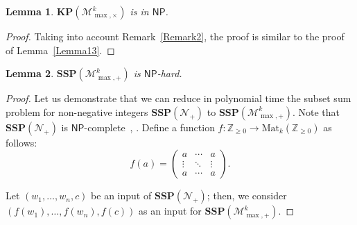 \documentclass[reqno,12pt]{amsart}
\newtheorem{lemma}{Lemma}
\theoremstyle{definition}
\newcommand{\Mat}{\mathrm{Mat}}
\newcommand{\NP}{\mathsf{NP}}
\newcommand{\MP}{\mathcal{M}_{\max, {+}}^k}
\newcommand{\MT}{\mathcal{M}_{\max, {\times}}^k}
\newcommand{\ZP}{\mathcal{N}_{+}}
\newcommand{\SSP}{\mathbf{SSP}(\ZP)}
\newcommand{\SSMPP}{\mathbf{SSP}(\MP)}
\newcommand{\KMTP}{\mathbf{KP}(\MT)}
\begin{document}
\begin{lemma}\label{Lemma14}
$\KMTP$ is in $\NP$.
\end{lemma}

\begin{proof}
Taking into account Remark~\ref{Remark2},
the proof is similar to the proof of Lemma~\ref{Lemma13}.
\end{proof}


\begin{lemma}\label{Lemma21}
$\SSMPP$ is $\NP$-hard.
\end{lemma}

\begin{proof}
Let us demonstrate that we can reduce in polynomial time the subset sum problem for non-negative integers $\SSP$ to $\SSMPP$. Note that $\SSP$ is $\NP$-complete~\cite[Problem SP13]{GareyJohnson1979}, \cite[Problem 18 (Knapsack)]{Karp1972}.
Define a function $f\colon \mathbb{Z}_{\geq 0} \to \Mat_k(\mathbb{Z}_{{\geq 0}})$ as follows:
\begin{equation}\label{FDef}
f(a) = 
\begin{pmatrix}
a      & \cdots & a     \\
\vdots & \ddots & \vdots \\
a      & \cdots & a      
\end{pmatrix}
.
\end{equation}

Let $(w_1, \ldots, w_n, c)$ be an input of $\SSP$;
then, we consider $(f(w_1), \ldots, f(w_n), f(c))$ as an input for $\SSMPP$.


\end{proof}
\end{document}
